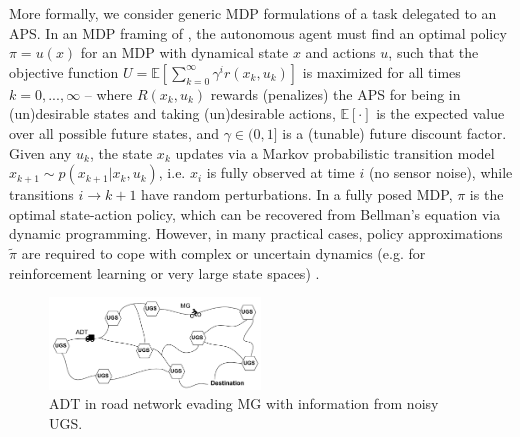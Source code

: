 More formally, we consider generic MDP formulations of a task \task{} delegated to an APS. In an MDP framing of \task{}, the autonomous agent must find an optimal policy $\pi = u(x)$ for an MDP with dynamical state $x$ and actions $u$, such that the objective function
$U = \mathbb{E} \left[\sum_{k=0}^{\infty} \gamma^i r(x_k,u_k) \right]$ is maximized for all times $k=0,...,\infty$ --  
where $R(x_k,u_k)$ rewards (penalizes) the APS for being in (un)desirable states and taking (un)desirable actions, $\mathbb{E}[\cdot]$ is the expected value over all possible future states, and $\gamma \in (0,1]$ is a (tunable) future discount factor. 
Given any $u_k$, the state $x_k$ updates via a Markov probabilistic transition model $x_{k+1} \sim p(x_{k+1}|x_{k},u_{k})$,  
i.e. $x_{i}$ is fully observed at time $i$ (no sensor noise), while transitions $i\rightarrow k+1$ have random perturbations.
In a fully posed MDP, $\pi$ is the optimal state-action policy, which can be recovered from Bellman's equation via dynamic programming. 
However, in many practical cases, policy approximations $\tilde{\pi}$ are required to cope with complex or uncertain dynamics (e.g. for reinforcement learning or very large state spaces) \cite{Kochenderfer2015-uu}. 
    
    
	\begin{figure}[t]%
    	\centering
     	\includegraphics[width=0.5\textwidth]{Figures/RoadNet}
    	\caption{ADT in road network evading MG with information from noisy UGS. } 
        \label{fig:RoadNet}
        \vspace{-0.2cm}
    \end{figure}    
    
